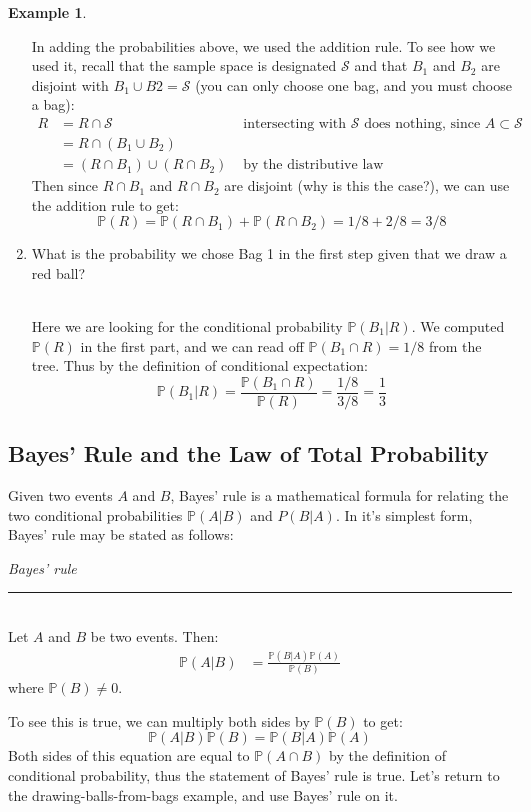 \documentclass[12pt]{article}
\theoremstyle{definition}
\newtheorem*{example}{Example}
\theoremstyle{remark}
\def\P{{\mathbb P}}
\def\cals{{\mathcal S}}
\begin{document}
\begin{example}
\begin{enumerate}
In adding the probabilities above, we used the addition rule. To see how we used it, recall that the sample space is designated $\cals$ and that $B_1$ and $B_2$ are disjoint with $B_1 \cup B2 = \cals$ (you can only choose one bag, and you must choose a bag):
\begin{align*}
R &= R \cap \cals & \text{ intersecting with $\cals$ does nothing, since $A \subset \cals$}\\
&= R \cap (B_1 \cup B_2) \\
&= (R \cap B_1) \cup (R \cap B_2) & \text{ by the distributive law}
\end{align*}
Then since $R \cap B_1$ and $R \cap B_2$ are disjoint (why is this the case?), we can use the addition rule to get:
\[
\P(R) = \P(R \cap B_1) + \P(R \cap B_2) = 1/8 + 2/8 = 3/8
\]

\item What is the probability we chose Bag 1 in the first step given that we draw a red ball?\\\

Here we are looking for the conditional probability $\P(B_1|R)$. We computed $\P(R)$ in the first part, and we can read off $\P(B_1 \cap R) = 1/8$ from the tree. Thus by the definition of conditional expectation:
\[
\P(B_1|R) = \frac{\P(B_1 \cap R)}{\P(R)} = \frac{1/8}{3/8} = \frac{1}{3}
\]
\end{enumerate}
\end{example}

\subsection{Bayes' Rule and the Law of Total Probability}
Given two events $A$ and $B$, Bayes' rule is a mathematical formula for relating the two conditional probabilities $\P(A|B)$ and $P(B|A)$. In it's simplest form, Bayes' rule may be stated as follows:

\begin{framed}
\emph{Bayes' rule}\\
  \rule{\dimexpr{}\fboxrule}{.1pt} \\
Let $A$ and $B$ be two events. Then:
\begin{align*}
\P(A | B) &= \frac{ \P(B|A)\P(A)}{\P(B)}
\end{align*}
where $\P(B) \neq 0.$
\end{framed}
To see this is true, we can multiply both sides by $\P(B)$ to get:
\[
\P(A|B) \P(B) = \P(B|A)\P(A)
\]
Both sides of this equation are equal to $\P(A\cap B)$ by the definition of conditional probability, thus the statement of Bayes' rule is true. Let's return to the drawing-balls-from-bags example, and use Bayes' rule on it.
\end{document}
